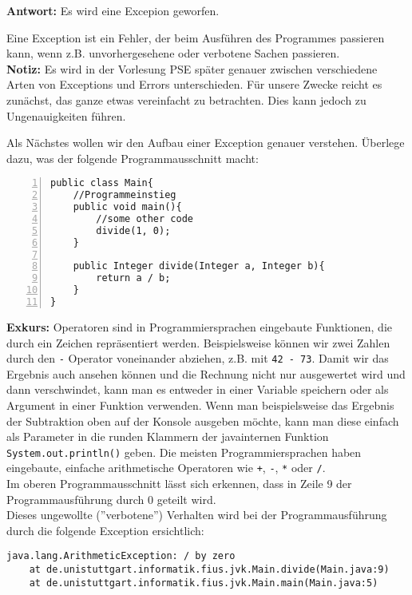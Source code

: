 \textbf{Antwort:} Es wird eine Excepion geworfen.\\
\begin{Infobox}[Exception]
    Eine Exception ist ein Fehler, der beim Ausführen des Programmes passieren kann, wenn z.B. unvorhergesehene oder verbotene Sachen passieren.\\

\textbf{Notiz:} Es wird in der Vorlesung PSE später genauer  zwischen verschiedene Arten von Exceptions und Errors unterschieden. 
Für unsere Zwecke reicht es zunächst, das ganze etwas vereinfacht zu betrachten.
Dies kann jedoch zu Ungenauigkeiten führen.

Als Nächstes wollen wir den Aufbau einer Exception genauer verstehen.
Überlege dazu, was der folgende Programmausschnitt macht:
    
    \begin{lstlisting}[numbers=left,xleftmargin=2em,frame=single,framexleftmargin=1.5em]
public class Main{
    //Programmeinstieg
    public void main(){
        //some other code
        divide(1, 0);
    }
    
    public Integer divide(Integer a, Integer b){
        return a / b;
    }
}
    \end{lstlisting}
    \textbf{Exkurs:} Operatoren sind in  Programmiersprachen eingebaute Funktionen, die durch ein Zeichen repräsentiert werden.
Beispielsweise können wir zwei Zahlen durch den \texttt{-} Operator voneinander abziehen, z.B. mit \texttt{42 - 73}.
Damit wir das Ergebnis auch ansehen können und die Rechnung nicht nur ausgewertet wird und dann verschwindet, kann man es entweder in einer Variable speichern oder als Argument in einer Funktion verwenden.
Wenn man beispielsweise das Ergebnis der Subtraktion oben auf der Konsole ausgeben möchte, kann man diese einfach als Parameter in die runden Klammern der javainternen Funktion \lstinline{System.out.println()} geben.
Die meisten Programmiersprachen haben eingebaute, einfache arithmetische Operatoren wie \texttt{+}, \texttt{-}, \texttt{*} oder \texttt{/}.\\
\newpage
Im oberen Programmausschnitt lässt sich erkennen, dass in Zeile 9 der Programmausführung durch 0 geteilt wird.\\
Dieses ungewollte (''verbotene'') Verhalten wird bei der Programmausführung durch die folgende Exception ersichtlich:
    \begin{lstlisting}[keywords={}, breaklines=true, numbers=none]
java.lang.ArithmeticException: / by zero
    at de.unistuttgart.informatik.fius.jvk.Main.divide(Main.java:9)
    at de.unistuttgart.informatik.fius.jvk.Main.main(Main.java:5)
    \end{lstlisting}    


\end{Infobox}
